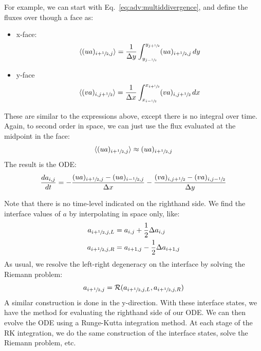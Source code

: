For example, we can start with Eq.~\ref{eq:adv:multiddivergence}, and define
the fluxes over though a face as:
\begin{itemize}
\item x-face:
\begin{equation}
\langle (ua)_{i+{\sfrac{1}{2}},j} \rangle = \frac{1}{\Delta y}
    \int_{y_{j-{\sfrac{1}{2}}}}^{y_{j+{\sfrac{1}{2}}}} (ua)_{i+{\sfrac{1}{2}},j}\, dy 
\end{equation}
\item y-face
\begin{equation}
\langle (va)_{i,j+{\sfrac{1}{2}}} \rangle = \frac{1}{\Delta x}
    \int_{x_{i-{\sfrac{1}{2}}}}^{x_{i+{\sfrac{1}{2}}}} (va)_{i,j+{\sfrac{1}{2}}}\, dx 
\end{equation}
\end{itemize}
These are similar to the expressions above, except there is no
integral over time.  Again, to second order in space, we can just
use the flux evaluated at the midpoint in the face:
\begin{equation}
\langle (ua)_{i+{\sfrac{1}{2}},j} \rangle \approx (ua)_{i+{\sfrac{1}{2}},j}
\end{equation}
The result is the ODE:
\begin{equation}
\frac{d a_{i,j}}{d t} =
   - \frac{(ua)_{i+{\sfrac{1}{2}},j} - (ua)_{i-{\sfrac{1}{2}},j}}{\Delta x}
   - \frac{(va)_{i,j+{\sfrac{1}{2}}} - (va)_{i,j-{\sfrac{1}{2}}}}{\Delta y}
\end{equation}

Note that there is no time-level indicated on the righthand side.  We
find the interface values of $a$ by interpolating in space only, like:
\begin{align}
a_{i+{\sfrac{1}{2}},j,L} &= a_{i,j} + \frac{1}{2} \Delta a_{i,j} \\
a_{i+{\sfrac{1}{2}},j,R} &= a_{i+1,j} - \frac{1}{2} \Delta a_{i+1,j}
\end{align}
As usual, we resolve the left-right degeneracy on the interface by solving 
the Riemann problem:
\begin{equation}
a_{i+{\sfrac{1}{2}},j} = \mathcal{R}(a_{i+{\sfrac{1}{2}},j,L}, a_{i+{\sfrac{1}{2}},j,R})
\end{equation}
A similar construction is done in the y-direction.  With these
interface states, we have the method for evaluating the righthand side
of our ODE.  We can then evolve the ODE using a Runge-Kutta
integration method.  At each stage of the RK integration, we do the
same construction of the interface states, solve the Riemann problem,
etc.

